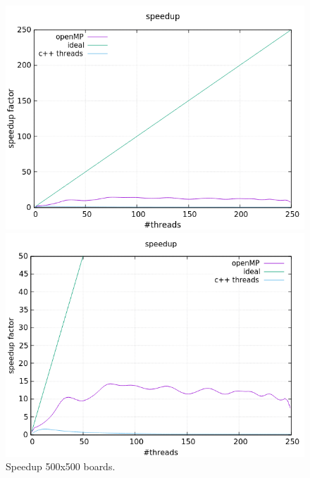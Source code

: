 \documentclass[a4paper,10pt]{article}
\begin{document}
\begin{figure}[H]
	\centering
	\begin{minipage}[t]{0.55\linewidth}
		\includegraphics[width=\linewidth]{500_standard_speed.png}
	\end{minipage}%
	\begin{minipage}[t]{0.55\linewidth}
		\includegraphics[width=\linewidth]{500_zoomed_speed.png}
	\end{minipage}
	\caption{Speedup 500x500 boards.}
	\label{500Speed}
\end{figure}
\end{document}
